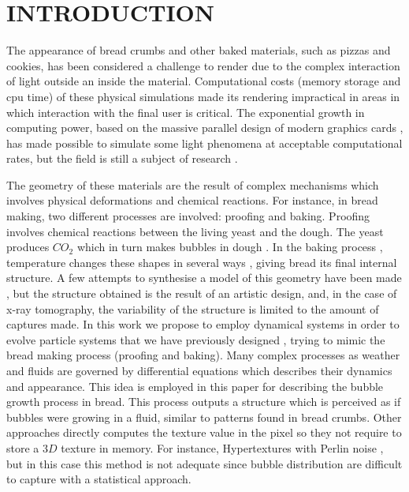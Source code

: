 \documentclass[oneside,a4paper,english,links]{amca}
\begin{document}
\section{INTRODUCTION}

The appearance of bread crumbs and other baked materials, such as pizzas and cookies, has been considered a challenge to render due to the complex interaction of light outside an inside the material. Computational costs (memory storage and cpu time) of these physical simulations made its rendering impractical in areas in which interaction with the final user is critical. The exponential growth in computing power, based on the massive parallel design of modern graphics cards \citep{Yeo09,Harris06}, has made possible to simulate some light phenomena at acceptable computational rates, but the field is still a subject of research \citep{Voglsam2013}.

The geometry of these materials are the result of complex mechanisms which involves physical deformations and chemical reactions. For instance, in bread making, two different processes are involved: proofing and baking. Proofing involves chemical reactions between the living yeast and the dough. The yeast produces $CO_{2}$ which in turn makes bubbles in dough \citep{Shah1998}. In the baking process \citep{Mondal2008}, temperature changes these shapes in several ways \citep{Scanlon2001}, giving bread its final internal structure. A few attempts to synthesise a model of this geometry have been made \citep{VanDyck2014,Cho2007}, but the structure obtained is the result of an artistic design, and, in the case of x-ray tomography, the variability of the structure is limited to the amount of captures made. In this work we propose to employ dynamical systems \citep{Strogatz2001} in order to evolve particle systems \citep{Reeves83} that we have previously designed \citep{Baravalle2011}, trying to mimic the bread making process (proofing and baking). Many complex processes as weather and fluids are governed by differential equations which describes their dynamics and appearance. This idea is employed in this paper for describing the bubble growth process in bread. This process outputs a structure which is perceived as if bubbles were growing in a fluid, similar to patterns found in bread crumbs. Other approaches directly computes the texture value in the pixel so they not require to store a $3D$ texture in memory. For instance, Hypertextures with Perlin noise \citep{Perlin1989}, but in this case this method is not adequate since bubble distribution are difficult to capture with a statistical approach.
\end{document}
